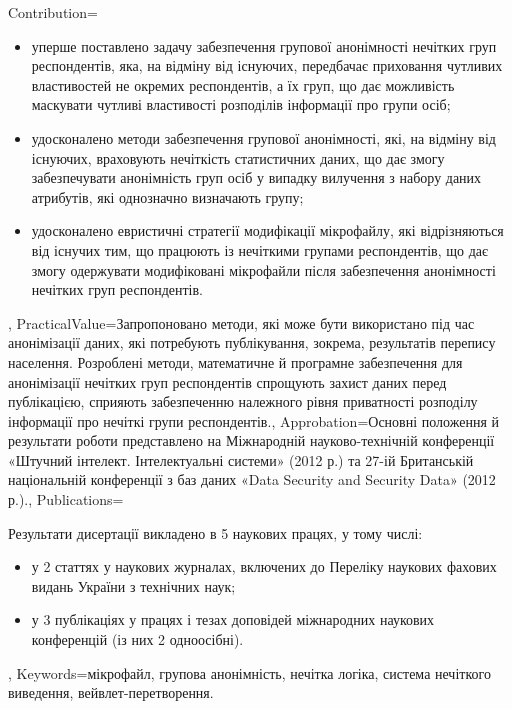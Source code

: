 \documentclass{master_thesis}
\begin{document}
{	Contribution={\begin{itemize}
		\item уперше поставлено задачу забезпечення групової анонімності нечітких груп респондентів, яка, на відміну від існуючих, передбачає приховання чутливих властивостей не окремих респондентів, а їх груп, що дає можливість маскувати чутливі властивості розподілів інформації про групи осіб;
		\item удосконалено методи забезпечення групової анонімності, які, на відміну від існуючих, враховують нечіткість статистичних даних, що дає змогу забезпечувати анонімність груп осіб у випадку вилучення з набору даних атрибутів, які однозначно визначають групу;
		\item удосконалено евристичні стратегії модифікації мікрофайлу, які відрізняються від існучих тим, що працюють із нечіткими групами респондентів, що дає змогу одержувати модифіковані мікрофайли після забезпечення анонімності нечітких груп респондентів.
	\end{itemize}
	},
	PracticalValue={Запропоновано методи, які може бути використано під час анонімізації даних, які потребують публікування, зокрема, результатів перепису населення. Розроблені методи, математичне й програмне забезпечення для анонімізації нечітких груп респондентів спрощують захист даних перед публікацією, сприяють забезпеченню належного рівня приватності розподілу інформації про нечіткі групи респондентів.},
	Approbation={Основні положення й результати роботи представлено на Міжнародній науково-технічній конференції «Штучний інтелект. Інтелектуальні системи» (2012 р.) та 27-ій Британській національній конференції з баз даних «Data Security and Security Data» (2012 р.).},
	Publications={Результати дисертації викладено в 5 наукових працях, у тому числі:
\begin{itemize}
	\item у 2 статтях у наукових журналах, включених до Переліку наукових фахових видань України з технічних наук;
	\item у 3 публікаціях у працях і тезах доповідей міжнародних наукових конференцій (із них 2 одноосібні).
\end{itemize}
	},
	Keywords={мікрофайл, групова анонімність, нечітка логіка, система нечіткого виведення, вейвлет-перетворення.}
}
\end{document}
